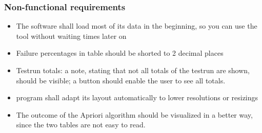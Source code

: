 \subsubsection{Non-functional requirements}
\begin{itemize}
\item The software shall load most of its data in the beginning, so you can use the tool without waiting times later on
\item Failure percentages in table should be shorted to 2 decimal places
\item Testrun totals: a note, stating that not all totals of the testrun are shown, should be visible; a button should enable the user to see all totals.

\item program shall adapt its layout automatically to lower resolutions or resizings
\item The outcome of the Apriori algorithm should be visualized in a better way, since the two tables are not easy to read.
\end{itemize}